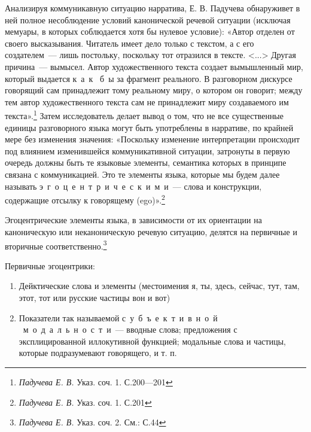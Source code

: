 \documentclass{kursa4}
\begin{document}
      Анализируя коммуникавную ситуацию нарратива, Е. В. Падучева
      обнаруживет в ней полное несоблюдение условий канонической речевой
      ситуации (исключая мемуары, в которых соблюдается хотя бы нулевое
      условие): «Автор отделен от своего высказывания. Читатель имеет дело
      только с текстом, а с его создателем~--- лишь постольку, поскольку тот
      отразился в тексте. \textless{}...\textgreater{} Другая причина~---
      вымысел. Автор художественного текста создает вымышленный мир, который
      выдается к~а~к \ б~ы за фрагмент реального. В разговорном дискурсе
      говорящий сам принадлежит тому реальному миру, о котором он говорит;
      между тем автор художественного текста сам не принадлежит миру
      создаваемого им текста».\footnote{\textit{{ Падучева
      Е. В. }}{Указ. соч. 1. С.200—201}} \newline
       Затем исследователь делает вывод о том, что не все существенные
      единицы разговорного языка могут быть употреблены в нарративе, по
      крайней мере без изменения значения: «Поскольку изменение интерпретации
      происходит под влиянием изменившейся коммуникативной ситуации,
      затронуты в первую очередь должны быть те языковые элементы, семантика
      которых в принципе связана с коммуникацией. Это те элементы языка,
      которые мы будем далее называть э~г~о~ц~е~н~т~р~и~ч~е~с~к~и~м~и~--- слова
      и конструкции, содержащие отсылку к говорящему
      (ego)».\footnote{\textit{{ Падучева Е. В.
      }}{Указ. соч. 1. С.201}} 

      Эгоцентрические элементы языка, в зависимости от их ориентации на
      каноническую или неканоническую речевую ситуацию, делятся на первичные
      и вторичные соответственно.\footnote{\textit{{
      Падучева Е. В. }}{Указ. соч. 2. См.: С.44}} 

      Первичные эгоцентрики:

      \begin{enumerate}
        \item Дейктические слова и элементы (местоимения я, ты, здесь, сейчас,
        тут, там, этот, тот или русские частицы вон и вот)
        \item Показатели так называемой {с~у~б~ъ~е~к~т~и~в~н~о~й} \ {м~о~д~а~л~ь~н~о~с~т~и}~--- вводные слова; предложения с эксплицированной иллокутивной
        функцией; модальные слова и частицы, которые подразумевают говорящего,
        и т. п.
      \end{enumerate}
\end{document}

